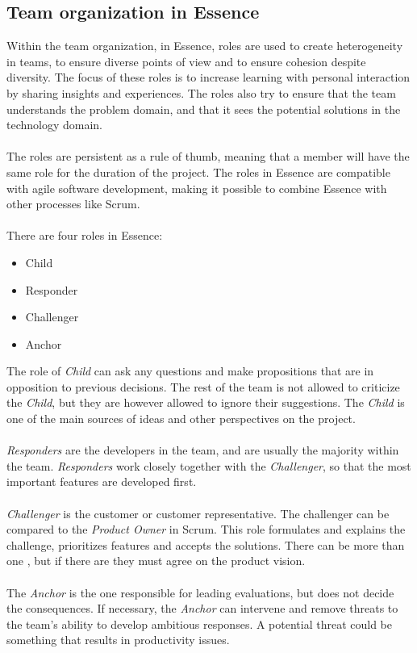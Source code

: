 \subsection{Team organization in Essence}
\label{sec:team-organization}
Within the team organization, in Essence, roles are used to create heterogeneity in teams, to ensure diverse points of view and to ensure cohesion despite diversity.
The focus of these roles is to increase learning with personal interaction by sharing insights and experiences.
The roles also try to ensure that the team understands the problem domain, and that it sees the potential solutions in the technology domain.
\\\\
The roles are persistent as a rule of thumb, meaning that a member will have the same role for the duration of the project.
The roles in Essence are compatible with agile software development, making it possible to combine Essence with other processes like Scrum.
\\\\
There are four roles in Essence:
\begin{itemize}
    \item Child
    \item Responder
    \item Challenger
    \item Anchor
\end{itemize}
The role of \textit{Child} can ask any questions and make propositions that are in opposition to previous decisions.
The rest of the team is not allowed to criticize the \textit{Child}, but they are however allowed to ignore their suggestions.
The \textit{Child} is one of the main sources of ideas and other perspectives on the project.
\\\\
\textit{Responders} are the developers in the team, and are usually the majority within the team.
\textit{Responders} work closely together with the \textit{Challenger}, so that the most important features are developed first.
\\\\
\textit{Challenger} is the customer or customer representative.
The challenger can be compared to the \textit{Product Owner} in Scrum.
This role formulates and explains the challenge, prioritizes features and accepts the solutions.
There can be more than one , but if there are they must agree on the product vision.
\\\\
The \textit{Anchor} is the one responsible for leading evaluations, but does not decide the consequences.
If necessary, the \textit{Anchor} can intervene and remove threats to the team's ability to develop ambitious responses.
A potential threat could be something that results in productivity issues.

